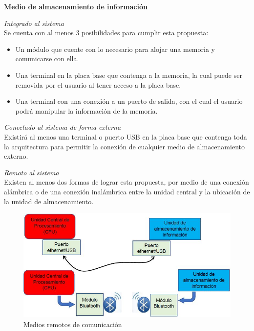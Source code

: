 \begin{center}
	\textbf{Medio de almacenamiento de información}
\end{center}

\newpage
\textit{Integrado al sistema} \\
Se cuenta con al menos 3 posibilidades para cumplir esta propuesta:
\begin{itemize}
	\item Un módulo que cuente con lo necesario para alojar una memoria y comunicarse con ella.
	\item Una terminal en la placa base que contenga a la memoria, la cual puede ser removida por el usuario al tener acceso a la placa base.
	\item Una terminal con una conexión a un puerto de salida, con el cual el usuario podrá manipular la información de la memoria.
\end{itemize}

\textit{Conectado al sistema de forma externa} \\
Existirá al menos una terminal o puerto USB en la placa base que contenga toda la arquitectura para permitir la conexión de cualquier medio de almacenamiento externo.

\textit{Remoto al sistema}\\
Existen al menos dos formas de lograr esta propuesta, por medio de una conexión alámbrica o de una conexión inalámbrica entre la unidad central y la ubicación de la unidad de almacenamiento.

\begin{figure}[H]
	\centering
	\includegraphics[width=\columnwidth]{imagenes/medioremoto}
	\caption{Medios remotos de comunicación}
	\label{fig:medioremoto}
\end{figure}

